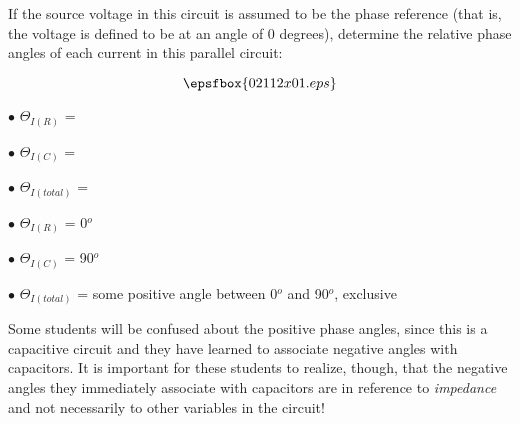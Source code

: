 

If the source voltage in this circuit is assumed to be the phase reference (that is, the voltage is defined to be at an angle of 0 degrees), determine the relative phase angles of each current in this parallel circuit:

$$\epsfbox{02112x01.eps}$$

\medskip
\item{$\bullet$} $\Theta_{I(R)}$ =
\item{$\bullet$} $\Theta_{I(C)}$ =
\item{$\bullet$} $\Theta_{I(total)}$ =
\medskip







\medskip
\goodbreak
\item{$\bullet$} $\Theta_{I(R)}$ = 0$^{o}$
\item{$\bullet$} $\Theta_{I(C)}$ = 90$^{o}$
\item{$\bullet$} $\Theta_{I(total)}$ = some positive angle between 0$^{o}$ and 90$^{o}$, exclusive
\medskip







Some students will be confused about the positive phase angles, since this is a capacitive circuit and they have learned to associate negative angles with capacitors.  It is important for these students to realize, though, that the negative angles they immediately associate with capacitors are in reference to {\it impedance} and not necessarily to other variables in the circuit!




